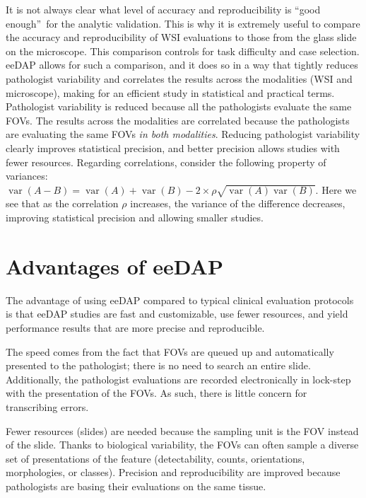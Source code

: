\documentclass{article}%
\begin{document}
It is not always clear what level of accuracy and reproducibility is
\textquotedblleft good enough\textquotedblright\ for the analytic validation.
This is why it is extremely useful to compare the accuracy and reproducibility
of WSI evaluations to those from the glass slide on the microscope. This
comparison controls for task difficulty and case selection. eeDAP allows for
such a comparison, and it does so in a way that tightly reduces pathologist
variability and correlates the results across the modalities (WSI and
microscope), making for an efficient study in statistical and practical terms.
Pathologist variability is reduced because all the pathologists evaluate the
same FOVs. The results across the modalities are correlated because the
pathologists are evaluating the same FOVs \emph{in both modalities}. Reducing
pathologist variability clearly improves statistical precision, and better
precision allows studies with fewer resources. Regarding correlations,
consider the following property of variances:\ $\operatorname{var}\left(
A-B\right)  =\operatorname{var}\left(  A\right)  +\operatorname{var}\left(
B\right)  -2\times\rho\sqrt{\operatorname{var}\left(  A\right)
\operatorname{var}\left(  B\right)  }.$ Here we see that as the correlation
$\rho$ increases, the variance of the difference decreases, improving
statistical precision and allowing smaller studies.

\section{Advantages of eeDAP}

\label{advantages-of-eedap}

The advantage of using eeDAP compared to typical clinical evaluation protocols
is that eeDAP studies are fast and customizable, use fewer resources, and
yield performance results that are more precise and reproducible.

The speed comes from the fact that FOVs are queued up and automatically
presented to the pathologist; there is no need to search an entire slide.
Additionally, the pathologist evaluations are recorded electronically in
lock-step with the presentation of the FOVs. As such, there is little concern
for transcribing errors.

Fewer resources (slides) are needed because the sampling unit is the FOV
instead of the slide. Thanks to biological variability, the FOVs can often
sample a diverse set of presentations of the feature (detectability, counts,
orientations, morphologies, or classes). Precision and reproducibility are
improved because pathologists are basing their evaluations on the same tissue.
\end{document}
